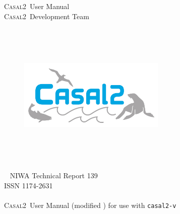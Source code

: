 \documentclass[a4paper,11pt,twoside,pdftex]{article}
\newcommand{\DocYear}{\SourceControlYearDoc}
\newcommand{\DocVer}{\SourceControlDateDoc}
\newcommand{\VER}{v\SourceControlShortVersionDoc} %
\newcommand{\CNAME}{\textsc{Casal2}}
\newcommand{\cname}{\texttt{casal2}} %
\newcommand{\authors}{\CNAME\ Development Team}
\begin{document}
\sloppy %


\begin{titlepage}
  \thispagestyle{empty} %
	\begin{center}

		\vspace*{2.5cm}
		\Huge \CNAME\ User Manual \\

		\vspace{2.0cm}
		\huge \authors %

		\vspace{2cm}
		\begin{figure}[htp]
			\begin{center}
			 \includegraphics[height=7cm,width=7cm]{Figures/CASAL2.png}
			\end{center}
		\end{figure}

		~\vfill
		\Large NIWA Technical Report 139 \\%
		\Large ISSN 1174-2631 \\%
		\Large \DocYear \\%

		\vspace{1.0cm}
		\CNAME\ User Manual (modified \DocVer) for use with \cname\texttt{-\VER}

	\end{center}
\end{titlepage}

\cleardoublepage{}
\fancyfoot[C]{\thepage}
\end{document}
